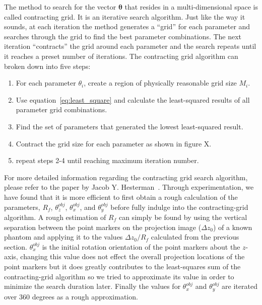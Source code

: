The method to search for the vector $\boldsymbol{\theta}$ that resides in a multi-dimensional space is called contracting grid.  It is an iterative search algorithm.  Just like the way it sounds, at each iteration the method generates a ``grid'' for each parameter and searches through the grid to find the best parameter combinations.  The next iteration ``contracts'' the grid around each parameter and the search repeats until it reaches a preset number of iterations.
The contracting grid algorithm can broken down into five steps:
\begin{enumerate}
\item For each parameter $\theta_i$, create a region of physically reasonable grid size $M_i$.
\item Use equation~\ref{eq:least_square} and calculate the least-squared results of all parameter grid combinations.
\item Find the set of parameters that generated the lowest least-squared result.
\item Contract the grid size for each parameter as shown in figure X.
\item repeat steps 2-4 until reaching maximum iteration number.
\end{enumerate}

For more detailed information regarding the contracting grid search algorithm, please refer to the paper by Jacob Y. Hesterman~\citep{Hesterman2010}.  Through experimentation, we have found that it is more efficient to first obtain a rough calculation of the parameters, $R_f$, $\theta^{obj}_z$, $\theta^{obj}_x$, and $\theta^{obj}_y$ before fully indulge into the contracting-grid algorithm.  A rough estimation of $R_f$ can simply be found by using the vertical separation between the point markers on the projection image ($\Delta z_0$) of a known phantom and applying it to the values $\Delta z_0/R_f$ calculated from the previous section.  $\theta^{obj}_x$ is the initial rotation orientation of the point markers about the $z$-axis, changing this value does not effect the overall projection locations of the point markers but it does greatly contributes to the least-squares sum of the contracting-grid algorithm so we tried to approximate its value in order to minimize the search duration later.  Finally the values for $\theta_x^{obj}$ and $\theta_y^{obj}$ are iterated over 360 degrees as a rough approximation.  

